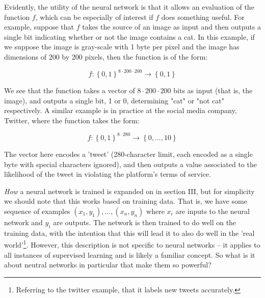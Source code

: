 \documentclass[11pt]{article}
\begin{document}
	Evidently, the utility of the neural network is that it allows an evaluation of the function $f$, which can be especially of interest if $f$ does something useful. For example, suppose that $f$ takes the source of an image as input and then outputs a single bit indicating whether or not the image contains a cat. In this example, if we suppose the image is gray-scale with 1 byte per pixel and the image has dimensions of 200 by 200 pixels, then the function is of the form:

\begin{equation}f: \left \{ 0,1 \right \}^{8\cdot 200 \cdot 200} \rightarrow  \left \{ 0,1 \right \} \nonumber\end{equation}

We see that the function takes a vector of $8\cdot 200 \cdot 200$ bits as input (that is, the image), and outputs a single bit, 1 or 0, determining "cat" or "not cat" respectively. A similar example is in practice at the social media company, Twitter, where the function takes the form:

\begin{equation}f: \left \{ 0,1 \right \}^{8\cdot 280} \rightarrow  \left \{ 0,...,10 \right \} \nonumber\end{equation}

The vector here encodes a 'tweet' (280-character limit, each encoded as a single byte with special characters ignored), and then outputs a value associated to the likelihood of the tweet in violating the platform's terms of service.

\textit{How} a neural network is trained is expanded on in section III, but for simplicity we should note that this works based on training data. That is, we have some sequence of examples $(x_{1},y_{1}),...,(x_{n},y_{n})$ where $x_{i}$ are inputs to the neural network and $y_{i}$ are outputs. The network is then trained to do well on the training data, with the intention that this will lead it to also do well in the 'real world'\footnote{Referring to the twitter example, that it labels new tweets accurately.}. However, this description is not specific to neural networks – it applies to all instances of supervised learning and is likely a familiar concept. So what is it about neutral networks in particular that make them so powerful?
\end{document}
